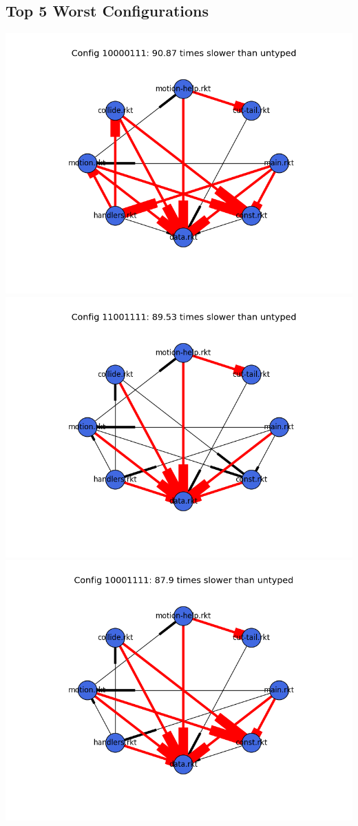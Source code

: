 \documentclass{article}
\begin{document}
\begin{itemize}
\subsection{Top 5 Worst Configurations}
\includegraphics[width=\textwidth]{snake-2015-04-10-module-graph-10000111.png}
\includegraphics[width=\textwidth]{snake-2015-04-10-module-graph-11001111.png}
\includegraphics[width=\textwidth]{snake-2015-04-10-module-graph-10001111.png}

\end{itemize}
\end{document}
